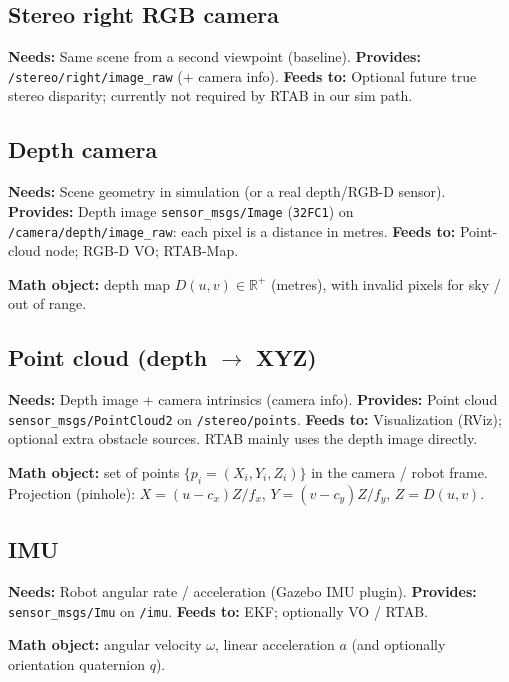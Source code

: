 \documentclass[11pt,a4paper]{article}
\newcommand{\needs}[1]{\textbf{Needs:} #1}
\newcommand{\provides}[1]{\textbf{Provides:} #1}
\newcommand{\feeds}[1]{\textbf{Feeds to:} #1}
\begin{document}
\subsection{Stereo right RGB camera}
\needs{Same scene from a second viewpoint (baseline).}
\provides{\texttt{/stereo/right/image\_raw} (+ camera info).}
\feeds{Optional future true stereo disparity; currently not required by RTAB in our sim path.}

\subsection{Depth camera}
\needs{Scene geometry in simulation (or a real depth/RGB-D sensor).}
\provides{Depth image \texttt{sensor\_msgs/Image} (\texttt{32FC1}) on \texttt{/camera/depth/image\_raw}: each pixel is a distance in metres.}
\feeds{Point-cloud node; RGB-D VO; RTAB-Map.}

\textbf{Math object:} depth map $D(u,v)\in\mathbb{R}^+$ (metres), with invalid pixels for sky / out of range.

\subsection{Point cloud (depth $\rightarrow$ XYZ)}
\needs{Depth image + camera intrinsics (camera info).}
\provides{Point cloud \texttt{sensor\_msgs/PointCloud2} on \texttt{/stereo/points}.}
\feeds{Visualization (RViz); optional extra obstacle sources. RTAB mainly uses the depth image directly.}

\textbf{Math object:} set of points $\{p_i=(X_i,Y_i,Z_i)\}$ in the camera / robot frame.
Projection (pinhole): $X=(u-c_x)Z/f_x$, $Y=(v-c_y)Z/f_y$, $Z=D(u,v)$.

\subsection{IMU}
\needs{Robot angular rate / acceleration (Gazebo IMU plugin).}
\provides{\texttt{sensor\_msgs/Imu} on \texttt{/imu}.}
\feeds{EKF; optionally VO / RTAB.}

\textbf{Math object:} angular velocity $\omega$, linear acceleration $a$ (and optionally orientation quaternion $q$).
\end{document}
